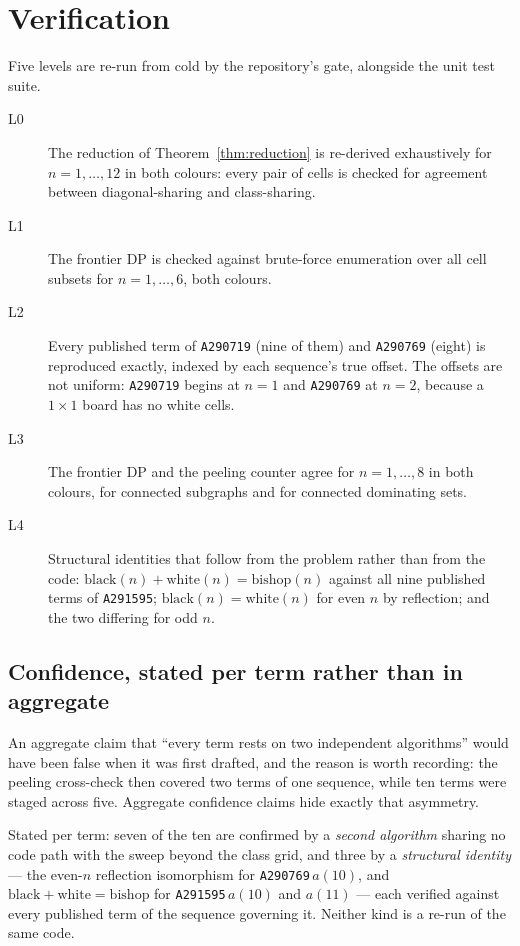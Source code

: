 \documentclass[11pt]{article}
\theoremstyle{remark}
\newcommand{\seq}[1]{\texttt{#1}}
\begin{document}
\section{Verification}

Five levels are re-run from cold by the repository's gate, alongside the unit
test suite.

\begin{description}
\item[L0] The reduction of Theorem~\ref{thm:reduction} is re-derived
exhaustively for $n = 1,\dots,12$ in both colours: every pair of cells is checked
for agreement between diagonal-sharing and class-sharing.
\item[L1] The frontier DP is checked against brute-force enumeration over all
cell subsets for $n = 1,\dots,6$, both colours.
\item[L2] Every published term of \seq{A290719} (nine of them) and
\seq{A290769} (eight) is reproduced exactly, indexed by each sequence's true
offset. The offsets are not uniform: \seq{A290719} begins at $n=1$ and
\seq{A290769} at $n=2$, because a $1 \times 1$ board has no white cells.
\item[L3] The frontier DP and the peeling counter agree for $n = 1,\dots,8$ in
both colours, for connected subgraphs and for connected dominating sets.
\item[L4] Structural identities that follow from the problem rather than from the
code: $\mathrm{black}(n) + \mathrm{white}(n) = \mathrm{bishop}(n)$ against all
nine published terms of \seq{A291595}; $\mathrm{black}(n) = \mathrm{white}(n)$
for even $n$ by reflection; and the two differing for odd $n$.
\end{description}

\subsection{Confidence, stated per term rather than in aggregate}

An aggregate claim that ``every term rests on two independent algorithms'' would
have been false when it was first drafted, and the reason is worth recording: the
peeling cross-check then covered two terms of one sequence, while ten terms were
staged across five. Aggregate confidence claims hide exactly that asymmetry.

Stated per term: seven of the ten are confirmed by a \emph{second algorithm}
sharing no code path with the sweep beyond the class grid, and three by a
\emph{structural identity} --- the even-$n$ reflection isomorphism for
\seq{A290769}\,$a(10)$, and $\mathrm{black}+\mathrm{white}=\mathrm{bishop}$ for
\seq{A291595}\,$a(10)$ and $a(11)$ --- each verified against every published term
of the sequence governing it. Neither kind is a re-run of the same code.
\end{document}
